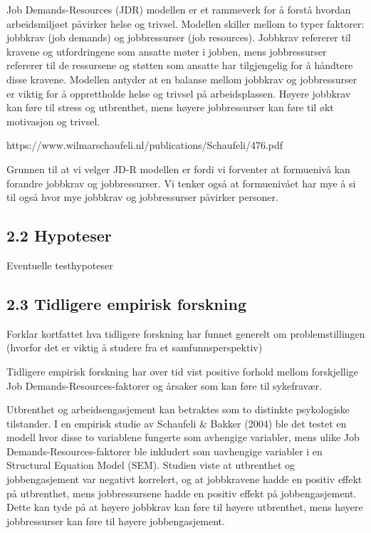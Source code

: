 \documentclass[
  12pt,
  a4paper,
  DIV=11,
  numbers=noendperiod]{scrartcl}
\begin{document}
Job Demands-Resources (JDR) modellen er et rammeverk for å forstå
hvordan arbeidsmiljøet påvirker helse og trivsel. Modellen skiller
mellom to typer faktorer: jobbkrav (job demands) og jobbressurser (job
resources). Jobbkrav refererer til kravene og utfordringene som ansatte
møter i jobben, mens jobbressurser refererer til de ressursene og
støtten som ansatte har tilgjengelig for å håndtere disse kravene.
Modellen antyder at en balanse mellom jobbkrav og jobbressurser er
viktig for å opprettholde helse og trivsel på arbeidsplassen. Høyere
jobbkrav kan føre til stress og utbrenthet, mens høyere jobbressurser
kan føre til økt motivasjon og trivsel.

https://www.wilmarschaufeli.nl/publications/Schaufeli/476.pdf

Grunnen til at vi velger JD-R modellen er fordi vi forventer at
formuenivå kan forandre jobbkrav og jobbressurser. Vi tenker også at
formuenivået har mye å si til også hvor mye jobbkrav og jobbressurser
påvirker personer.

\subsection{2.2 Hypoteser}\label{hypoteser}

Eventuelle testhypoteser

\subsection{2.3 Tidligere empirisk
forskning}\label{tidligere-empirisk-forskning}

Forklar kortfattet hva tidligere forskning har funnet generelt om
problemstillingen (hvorfor det er viktig å studere fra et
samfunnsperspektiv)

Tidligere empirisk forskning har over tid vist positive forhold mellom
forskjellige Job Demands-Resources-faktorer og årsaker som kan føre til
sykefravær.

Utbrenthet og arbeidsengasjement kan betraktes som to distinkte
psykologiske tilstander. I en empirisk studie av Schaufeli \& Bakker
(2004) ble det testet en modell hvor disse to variablene fungerte som
avhengige variabler, mens ulike Job Demands-Resources-faktorer ble
inkludert som uavhengige variabler i en Structural Equation Model (SEM).
Studien viste at utbrenthet og jobbengasjement var negativt korrelert,
og at jobbkravene hadde en positiv effekt på utbrenthet, mens
jobbressursene hadde en positiv effekt på jobbengasjement. Dette kan
tyde på at høyere jobbkrav kan føre til høyere utbrenthet, mens høyere
jobbressurser kan føre til høyere jobbengasjement.
\end{document}
